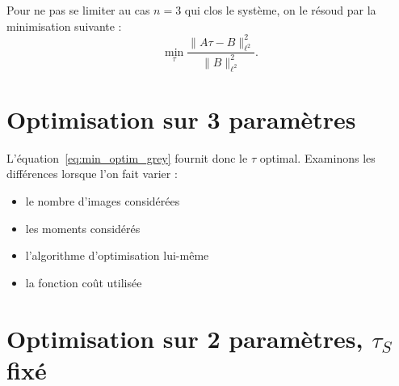 \documentclass[main.tex]{subfiles}
\begin{document}
Pour ne pas se limiter au cas $n=3$ qui clos le système, on le résoud par la minimisation suivante :
\begin{equation}\label{eq:min_optim_grey}
\min_{\tau} \dfrac{\| A\tau - B \|^2_{\ell^2}}{\|B\|^2_{\ell^2}}.
\end{equation}

\section{Optimisation sur 3 paramètres}
L'équation~\eqref{eq:min_optim_grey} fournit donc le $\tau$ optimal. Examinons les différences lorsque l'on fait varier :
\begin{itemize}
\item le nombre d'images considérées
\item les moments considérés
\item l'algorithme d'optimisation lui-même
\item la fonction coût utilisée
\end{itemize}

\section{Optimisation sur 2 paramètres, $\tau_S$ fixé} 
\end{document}
